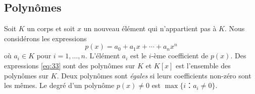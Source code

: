 \subsection{Polynômes}
\label{sec:polynomes}
Soit $K$ un corps et soit $x$ un nouveau élément qui n'appartient pas à $K$. Nous considérons les expressions 
\begin{equation}
  \label{eq:33}
  p(x) = a_0 + a_1 x + \cdots + a_n x^n
\end{equation}
où $a_i ∈K$ pour $i=1,\dots,n$.  L'élément $a_i$ est le $i$-ème coefficient de $p(x)$. 
Des expressions \eqref{eq:33} sont des polynômes sur $K$  et $K[x]$ est l'ensemble des polynômes sur $K$. Deux polynômes 
sont \emph{égales} si leurs coefficients non-zéro  sont les mêmes. Le degré d'un  polynôme $p(x)≠0$ est $\max\{i ：a_i ≠0\}$.  

